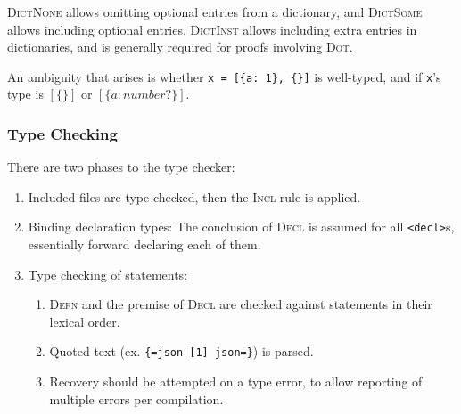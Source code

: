 \begin{mathparpagebreakable}




\end{mathparpagebreakable}

\textsc{DictNone} allows omitting optional entries from a dictionary, and
\textsc{DictSome} allows including optional entries. \textsc{DictInst} allows
including extra entries in dictionaries, and is generally required for proofs
involving \textsc{Dot}.

An ambiguity that arises is whether \texttt{x = [\{a: 1\}, \{\}]} is well-typed,
and if \texttt{x}'s type is $[\{\}]$ or $[\{ a: number? \}]$.

\subsubsection{Type Checking}

There are two phases to the type checker:

\begin{enumerate}
  \item Included files are type checked, then the \textsc{Incl}
        rule is applied.
  \item Binding declaration types: The conclusion of \textsc{Decl} is assumed
        for all \texttt{<decl>}s, essentially forward declaring each of them.
  \item Type checking of statements:
        \begin{enumerate}
          \item \textsc{Defn} and the premise of \textsc{Decl}
                are checked against statements in their lexical order.
          \item Quoted text (ex. \texttt{\{=json [1] json=\}}) is parsed.
          \item Recovery should be attempted on a type error, to allow reporting
                of multiple errors per compilation.
        \end{enumerate}
\end{enumerate}

